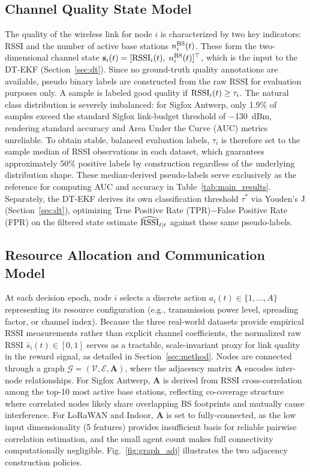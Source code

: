 \documentclass[conference]{IEEEtran}
\begin{document}
\subsection{Channel Quality State Model}

The quality of the wireless link for node $i$ is characterized by two
key indicators: RSSI and the number of active base stations $n^{\rm BS}_i(t)$.
These form the two-dimensional channel state
$\mathbf{s}_i(t)=[{\rm RSSI}_i(t),\;n^{\rm BS}_i(t)]^\top$, which is
the input to the DT-EKF (Section~\ref{sec:dt}).
Since no ground-truth quality annotations are available, pseudo binary
labels are constructed from the raw RSSI for evaluation purposes only.
A sample is labeled good quality if ${\rm RSSI}_i(t)\geq\tau_i$.
The natural class distribution is severely imbalanced: for Sigfox Antwerp,
only 1.9\% of samples exceed the standard Sigfox link-budget threshold of
$-$130~dBm, rendering standard accuracy and Area Under the Curve (AUC) metrics unreliable.
To obtain stable, balanced evaluation labels, $\tau_i$ is therefore set
to the sample median of RSSI observations in each dataset, which
guarantees approximately 50\% positive labels by construction regardless
of the underlying distribution shape. These median-derived pseudo-labels
serve exclusively as the reference for computing AUC and accuracy in
Table~\ref{tab:main_results}. Separately, the DT-EKF derives
its own classification threshold $\tau^*$ via Youden's J
(Section~\ref{sec:dt}), optimizing True Positive Rate (TPR)$-$False Positive Rate (FPR) on the filtered state
estimate $\widehat{\rm RSSI}_{t|t}$ against these same pseudo-labels.

\subsection{Resource Allocation and Communication Model}

At each decision epoch, node $i$ selects a discrete action
$a_i(t)\in\{1,\ldots,A\}$ representing its resource configuration
(e.g., transmission power level, spreading factor, or channel index).
Because the three real-world datasets provide empirical RSSI measurements
rather than explicit channel coefficients, the normalized raw RSSI
$\bar{s}_i(t)\in[0,1]$ serves as a tractable, scale-invariant proxy
for link quality in the reward signal, as detailed in
Section~\ref{sec:method}. Nodes are connected through a graph
$\mathcal{G}=(\mathcal{V},\mathcal{E},\mathbf{A})$, where the adjacency
matrix $\mathbf{A}$ encodes inter-node relationships.
For Sigfox Antwerp, $\mathbf{A}$ is derived from RSSI cross-correlation
among the top-10 most active base stations, reflecting co-coverage
structure where correlated nodes likely share overlapping BS footprints
and mutually cause interference.
For LoRaWAN and Indoor, $\mathbf{A}$ is set to fully-connected, as the
low input dimensionality (5 features) provides insufficient basis for
reliable pairwise correlation estimation, and the small agent count
makes full connectivity computationally negligible.
Fig.~\ref{fig:graph_adj} illustrates the two adjacency construction policies.
\end{document}
